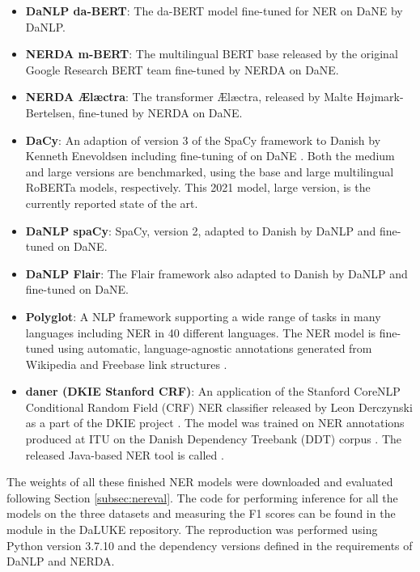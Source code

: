 \documentclass[main.tex]{subfiles}
\begin{document}
\begin{itemize}
    \item \textbf{DaNLP da-BERT}: The da-BERT model \cite{botxo2019dabert} fine-tuned for NER on DaNE by DaNLP.
    \item \textbf{NERDA m-BERT}: The multilingual BERT base released by the original Google Research BERT team \cite{devlin2019bert} fine-tuned by NERDA \cite{kjeldgaard2020nerda} on DaNE.
    \item \textbf{NERDA Ælæctra}: The transformer Ælæctra, released by Malte Højmark-Bertelsen, \cite{bertelsen2020lctra} fine-tuned by NERDA on DaNE.
    \item \textbf{DaCy}: An adaption of version 3 of the SpaCy framework \cite{honnibal2020spacy} to Danish by Kenneth Enevoldsen including fine-tuning of on DaNE \cite{enevoldsen2020dacy}.
        Both the medium and large versions are benchmarked, using the base and large multilingual RoBERTa \cite{conneau2020unsupervised} models, respectively.
        This 2021 model, large version, is the currently reported state of the art.
    \item \textbf{DaNLP spaCy}: SpaCy, version 2, adapted to Danish by DaNLP and fine-tuned on DaNE.
    \item \textbf{DaNLP Flair}: The Flair framework \cite{akbik2019flair} also adapted to Danish by DaNLP and fine-tuned on DaNE.
    \item \textbf{Polyglot}: A NLP framework supporting a wide range of tasks in many languages including NER in 40 different languages.
        The NER model is fine-tuned using automatic, language-agnostic annotations generated from Wikipedia and Freebase link structures \cite{rfou2015polyglot}.
    \item \textbf{daner (DKIE Stanford CRF)}: An application of the Stanford CoreNLP Conditional Random Field (CRF) NER classifier \cite{manning2014corenlp} released by Leon Derczynski as a part of the DKIE project \cite{derc2014dkie}.
    The model was trained on NER annotations produced at ITU on the Danish Dependency Treebank (DDT) corpus \cite{kromann2003ddt}.
    The released Java-based NER tool is called \footnotemark.
\end{itemize}
\noindent
The weights of all these finished NER models were downloaded and evaluated following Section \ref{subsec:nereval}.
The code for performing inference for all the models on the three datasets and measuring the F1 scores can be found in the module  in the DaLUKE repository\footnotemark.
The reproduction was performed using Python version 3.7.10 and the dependency versions defined in the requirements of DaNLP and NERDA.
\end{document}
